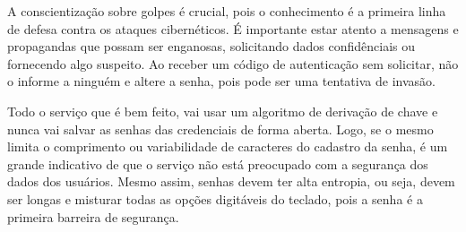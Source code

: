 \documentclass[12pt]{article}
\begin{document}
A conscientização sobre golpes é crucial, pois o conhecimento é a primeira linha de defesa contra
os ataques cibernéticos.
É importante estar atento a mensagens e propagandas que possam ser enganosas, solicitando dados
confidênciais ou fornecendo algo suspeito.
Ao receber um código de autenticação sem solicitar, não o informe a ninguém e altere a senha,
pois pode ser uma tentativa de invasão.

Todo o serviço que é bem feito, vai usar um algoritmo de derivação de chave e nunca vai salvar
as senhas das credenciais de forma aberta.
Logo, se o mesmo limita o comprimento ou variabilidade de caracteres do cadastro da senha, é um
grande indicativo de que o serviço não está preocupado com a segurança dos dados dos usuários.
Mesmo assim, senhas devem ter alta entropia, ou seja, devem ser longas e misturar todas as opções
digitáveis do teclado, pois a senha é a primeira barreira de segurança.



\end{document}

